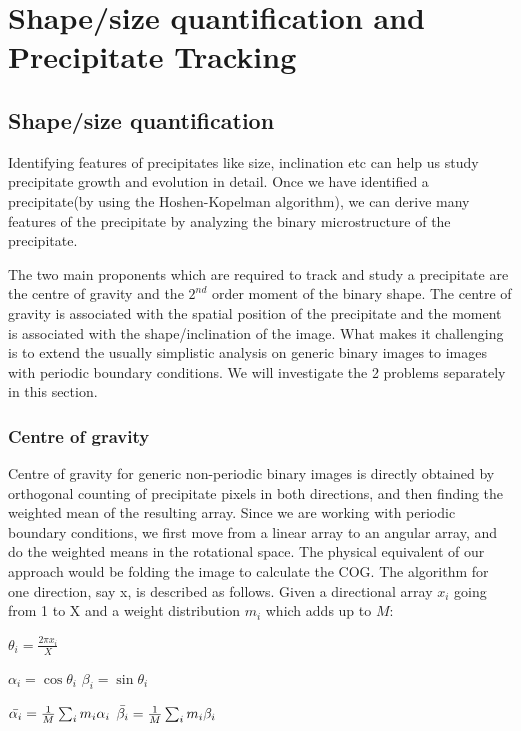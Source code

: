 \documentclass[12pt, a4paper]{report}
\begin{document}

\chapter{Shape/size quantification and Precipitate Tracking}

\section{Shape/size quantification}
Identifying features of precipitates like size, inclination etc can help us study precipitate growth and evolution in detail. Once we have identified a precipitate(by using the Hoshen-Kopelman algorithm), we can derive many features of the precipitate by analyzing the binary microstructure of the precipitate.

The two main proponents which are required to track and study a precipitate are the centre of gravity and the $2^{nd}$ order moment of the binary shape. The centre of gravity is associated with the spatial position of the precipitate and the moment is associated with the shape/inclination of the image. What makes it challenging is to extend the usually simplistic analysis on generic binary images to images with periodic boundary conditions. We will investigate the 2 problems separately in this section.

\subsection{Centre of gravity}
Centre of gravity for generic non-periodic binary images is directly obtained by orthogonal counting of precipitate pixels in both directions, and then finding the weighted mean of the resulting array. Since we are working with periodic boundary conditions, we first move from a linear array to an angular array, and do the weighted means in the rotational space. The physical equivalent of our approach would be folding the image to calculate the COG. The algorithm for one direction, say x, is described as follows. Given a directional array $x_i$ going from 1 to X and a weight distribution $m_i$ which adds up to $M$:

$\theta_i = \frac{2{\pi}x_i}{X}$

$\alpha_i = \cos{{\theta}_i}$
$\beta_i = \sin{{\theta}_i}$

$\Bar{\alpha_i} = \frac{1}{M}\sum_i {m_i}{\alpha_i} $          $\Bar{\beta_i} = \frac{1}{M}\sum_i {m_i}{\beta_i}$
\end{document}
